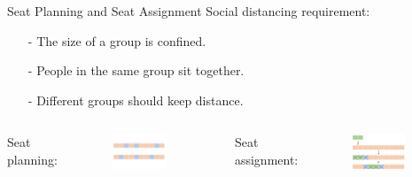     \begin{frame}{Seat Planning and Seat Assignment}
      Social distancing requirement: 
      
      \begin{itemize}
        \item[-] The size of a group is confined.
        \item[-] People in the same group sit together.
        \item[-] Different groups should keep distance.
      \end{itemize}
      
      \vspace{0.5cm}

      \begin{columns}
        \column{5cm}  %
        Seat planning: 
          \begin{figure}[ht]
            \centering
            \includegraphics[width = 0.8\textwidth]{./images/seat_planning1.png}
          \end{figure}
          \column{5cm}
        Seat assignment:
          \scriptsize
          \begin{figure}[ht]
            \centering
            \includegraphics[width = 0.8\textwidth]{./images/seat_assignment1.png}
          \end{figure}
      \end{columns}
    \end{frame}
    

